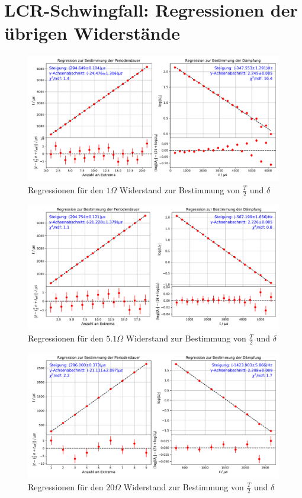 \documentclass[a4paper, 12pt]{scrartcl}
\begin{document}
\section{LCR-Schwingfall: Regressionen der übrigen Widerstände}\label{app:reg}
\begin{figure}[H]
\centering
\includegraphics[width=\textwidth]{plots/reg_schwingung1.pdf}
\caption{Regressionen für den $1\Omega$ Widerstand zur Bestimmung von $\frac{T}{2}$ und $\delta$}
\end{figure}
\begin{figure}[H]
\centering
\includegraphics[width=\textwidth]{plots/reg_schwingung2.pdf}
\caption{Regressionen für den $5.1\Omega$ Widerstand zur Bestimmung von $\frac{T}{2}$ und $\delta$}
\end{figure}
\begin{figure}[H]
\centering
\includegraphics[width=\textwidth]{plots/reg_schwingung4.pdf}
\caption{Regressionen für den $20\Omega$ Widerstand zur Bestimmung von $\frac{T}{2}$ und $\delta$}
\end{figure}
\end{document}
